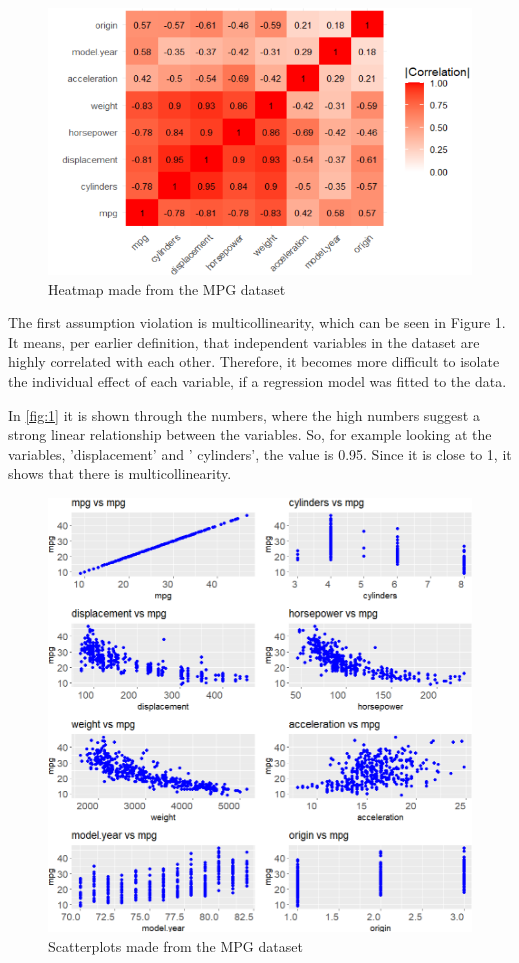 \begin{figure}
	\centering
	\centering
	\includegraphics{billder/1.png}
	\caption{Heatmap made from the MPG dataset}
	\label{fig:1}
\end{figure}

\noindent The first assumption violation is multicollinearity, which can be seen in Figure 1. It means, per earlier definition, that independent variables in the dataset are highly correlated with each other. Therefore, it becomes more difficult to isolate the individual effect of each variable, if a regression model was fitted to the data.

In \autoref{fig:1} it is shown through the numbers, where the high numbers suggest a strong linear relationship between the variables. So, for example looking at the variables, 'displacement' and ' cylinders', the value is 0.95. Since it is close to 1, it shows that there is multicollinearity. \newline


\begin{figure}[h]
	\includegraphics[width=\linewidth]{billder/2.png}
	\caption{Scatterplots made from the MPG dataset}
	\label{fig:2}
\end{figure}

